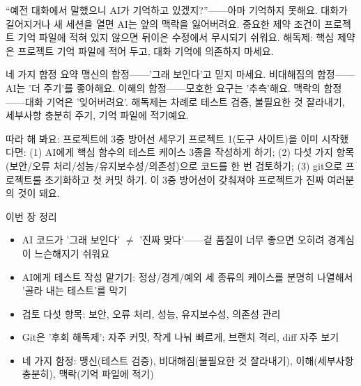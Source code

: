 
“예전 대화에서 말했으니 AI가 기억하고 있겠지?”——아마 기억하지 못해요. 대화가 길어지거나 새 세션을 열면 AI는 앞의 맥락을 잃어버려요. 중요한 제약 조건이 프로젝트 기억 파일에 적혀 있지 않으면 뒤이은 수정에서 무시되기 쉬워요. 해독제: 핵심 제약은 프로젝트 기억 파일에 적어 두고, 대화 기억에 의존하지 마세요.

\begin{tcbwarn}{네 가지 함정 요약}
맹신의 함정——'그래 보인다'고 믿지 마세요. 비대해짐의 함정——AI는 '더 주기'를 좋아해요. 이해의 함정——모호한 요구는 '추측'해요. 맥락의 함정——대화 기억은 '잊어버려요'. 해독제는 차례로 테스트 검증, 불필요한 것 잘라내기, 세부사항 충분히 주기, 기억 파일에 적기예요.

\end{tcbwarn}

\begin{tcbpractice}{따라 해 봐요: 프로젝트에 3중 방어선 세우기}
프로젝트 1(도구 사이트)을 이미 시작했다면: (1) AI에게 핵심 함수의 테스트 케이스 3종을 작성하게 하기; (2) 다섯 가지 항목(보안/오류 처리/성능/유지보수성/의존성)으로 코드를 한 번 검토하기; (3) git으로 프로젝트를 초기화하고 첫 커밋 하기. 이 3중 방어선이 갖춰져야 프로젝트가 진짜 여러분의 것이 돼요.

\end{tcbpractice}

\begin{tcbsummary}{이번 장 정리}
\begin{itemize}
  \item AI 코드가 '그래 보인다' $\neq$ '진짜 맞다'——겉 품질이 너무 좋으면 오히려 경계심이 느슨해지기 쉬워요
  \item AI에게 테스트 작성 맡기기: 정상/경계/예외 세 종류의 케이스를 분명히 나열해서 '골라 내는 테스트'를 막기
  \item 검토 다섯 항목: 보안, 오류 처리, 성능, 유지보수성, 의존성 관리
  \item Git은 '후회 해독제': 자주 커밋, 작게 나눠 빠르게, 브랜치 격리, diff 자주 보기
  \item 네 가지 함정: 맹신(테스트 검증), 비대해짐(불필요한 것 잘라내기), 이해(세부사항 충분히), 맥락(기억 파일에 적기)
\end{itemize}

\end{tcbsummary}
